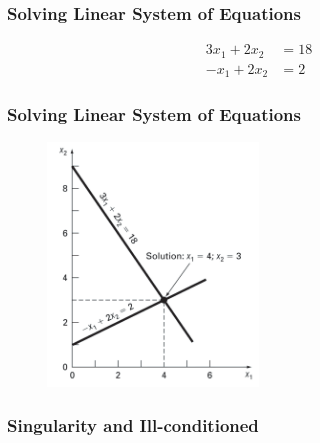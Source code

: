 \documentclass[notes]{beamer}
\begin{document}
\begin{frame}
	\frametitle{Solving Linear System of Equations}
	\begin{align*}
		3 x_1 + 2 x_2 & = 18 \\
		-x_1 + 2 x_2 & = 2
	\end{align*}
\end{frame}

\begin{frame}
	\frametitle{Solving Linear System of Equations}
	\begin{figure}[ht]
		\centering
		\includegraphics[width=0.5\textwidth]{figs/graphical-linear-systems.png}
	\end{figure}
\end{frame}

\begin{frame}
	\frametitle{Singularity and Ill-conditioned}
\end{frame}

\end{document}
